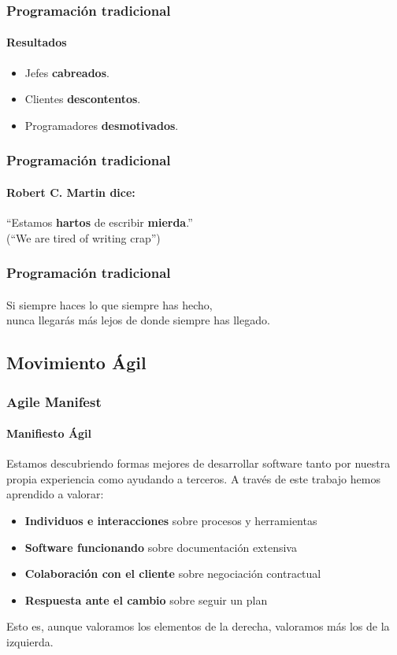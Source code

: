 \begin{frame}
  \frametitle{Programación tradicional}
  \framesubtitle{Resultados}

  \begin{itemize}
  \item Jefes \textbf{cabreados}.
  \item Clientes \textbf{descontentos}.
  \item Programadores \textbf{desmotivados}.
  \end{itemize}
\end{frame}


\begin{frame}
  \frametitle{Programación tradicional}
  \framesubtitle{Robert C. Martin dice:}

  ``Estamos \textbf{hartos} de escribir \textbf{mierda}.''\\[3pc]
  (``We are tired of writing crap'')

\end{frame}


\begin{frame}
  \frametitle{Programación tradicional}
  \framesubtitle{}

  Si siempre haces lo que siempre has hecho,\\
  nunca llegarás más lejos de donde siempre has llegado.

\end{frame}


\subsection{Movimiento Ágil}

\begin{frame}
  \frametitle{Agile Manifest}
  \framesubtitle{Manifiesto Ágil}
Estamos descubriendo formas mejores de desarrollar
software tanto por nuestra propia experiencia como
ayudando a terceros. A través de este trabajo hemos
aprendido a valorar:

 \begin{itemize}
 \item \textbf{Individuos e interacciones} sobre procesos y herramientas
 \item \textbf{Software funcionando} sobre documentación extensiva
 \item \textbf{Colaboración con el cliente} sobre negociación contractual
 \item \textbf{Respuesta ante el cambio} sobre seguir un plan
  \end{itemize}

Esto es, aunque valoramos los elementos de la derecha,
valoramos más los de la izquierda.


\end{frame}


